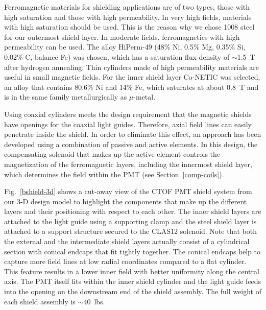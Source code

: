 \documentclass{elsart}
\begin{document}
Ferromagnetic materials for shielding applications are of two types, those with high saturation
and those with high permeability. In very high fields, materials with high saturation should
be used. This is the reason why we chose 1008 steel for our outermost shield layer. In
moderate fields, ferromagnetics with high permeability can be used. The alloy HiPerm-49
(48\% Ni, 0.5\% Mg, 0.35\% Si, 0.02\% C, balance Fe) was chosen, which has a saturation flux 
density of $\sim$1.5~T after hydrogen annealing. Thin cylinders made of high permeability 
materials are useful in small magnetic fields. For the inner shield layer Co-NETIC was selected, 
an alloy that contains 80.6\% Ni and 14\% Fe, which saturates at about 0.8~T and is in the same 
family metallurgically as $\mu$-metal.

Using coaxial cylinders meets the design requirement that the magnetic shields have openings 
for the coaxial light guides. Therefore, axial field lines can easily penetrate inside the 
shield. In order to eliminate this effect, an approach has been developed using a 
combination of passive and active elements. In this design, the compensating solenoid that 
makes up the active element controls the magnetization of the ferromagnetic layers, including 
the innermost shield layer, which determines the field within the PMT (see 
Section~\ref{comp-coils}).

Fig.~\ref{bshield-3d} shows a cut-away view of the CTOF PMT shield system from our 3-D design 
model to highlight the components that make up the different layers and their positioning with 
respect to each other. The inner shield layers are attached to the light guide using a 
supporting clamp and the steel shield layer is attached to a support structure secured to the 
CLAS12 solenoid. Note that both the external and the intermediate shield layers actually 
consist of a cylindrical section with conical endcaps that fit tightly together. The conical 
endcaps help to capture more field lines at low radial coordinates compared to a flat cylinder. 
This feature results in a lower inner field with better uniformity along the central axis. The 
PMT itself fits within the inner shield cylinder and the light guide feeds into the opening on 
the downstream end of the shield assembly. The full weight of each shield assembly is 
$\sim$40~lbs.
\end{document}
